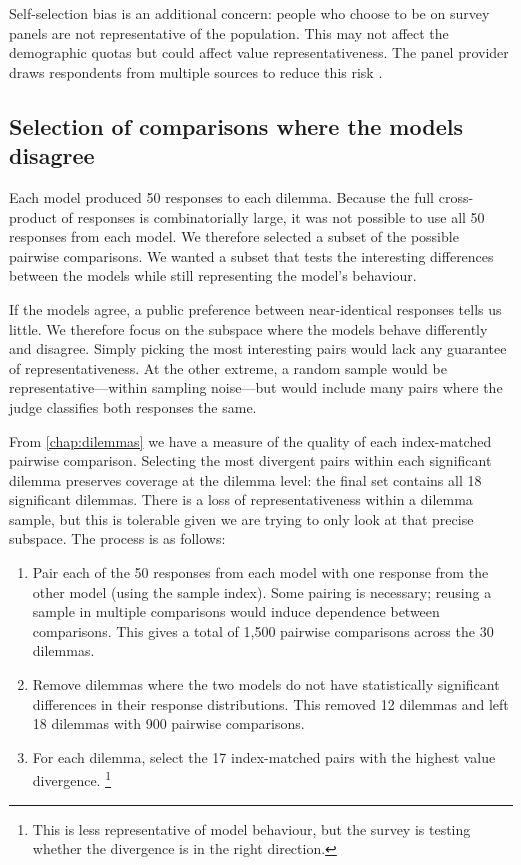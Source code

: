 Self-selection bias is an additional concern: people who choose to be on survey panels are not representative of the population. This may not affect the demographic quotas but could affect value representativeness. The panel provider draws respondents from multiple sources to reduce this risk \cite{boomImportanceMultisourcingRepresentativeness2023}.

\subsection{Selection of comparisons where the models disagree}

Each model produced 50 responses to each dilemma. Because the full cross-product of responses is combinatorially large, it was not possible to use all 50 responses from each model. We therefore selected a subset of the possible pairwise comparisons. We wanted a subset that tests the interesting differences between the models while still representing the model's behaviour.

If the models agree, a public preference between near-identical responses tells us little. We therefore focus on the subspace where the models behave differently and disagree. Simply picking the most interesting pairs would lack any guarantee of representativeness. At the other extreme, a random sample would be representative—within sampling noise—but would include many pairs where the judge classifies both responses the same.

From \ref{chap:dilemmas} we have a measure of the quality of each index-matched pairwise comparison. Selecting the most divergent pairs within each significant dilemma preserves coverage at the dilemma level: the final set contains all 18 significant dilemmas. There is a loss of representativeness within a dilemma sample, but this is tolerable given we are trying to only look at that precise subspace. The process is as follows:
\begin{enumerate}
    \item Pair each of the 50 responses from each model with one response from the other model (using the sample index). Some pairing is necessary; reusing a sample in multiple comparisons would induce dependence between comparisons. This gives a total of 1,500 pairwise comparisons across the 30 dilemmas.
    \item Remove dilemmas where the two models do not have statistically significant differences in their response distributions. This removed 12 dilemmas and left 18 dilemmas with 900 pairwise comparisons.
    \item For each dilemma, select the 17 index-matched pairs with the highest value divergence. \footnote{This is less representative of model behaviour, but the survey is testing whether the divergence is in the right direction.}
\end{enumerate}


